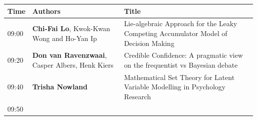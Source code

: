 \documentclass[]{article}
\begin{document}
\begin{longtable}[]{@{}lll@{}}
\toprule
\begin{minipage}[b]{0.03\columnwidth}\raggedright\strut
Time\strut
\end{minipage} & \begin{minipage}[b]{0.35\columnwidth}\raggedright\strut
Authors\strut
\end{minipage} & \begin{minipage}[b]{0.53\columnwidth}\raggedright\strut
Title\strut
\end{minipage}\tabularnewline
\midrule
\endhead
\begin{minipage}[t]{0.03\columnwidth}\raggedright\strut
09:00\strut
\end{minipage} & \begin{minipage}[t]{0.35\columnwidth}\raggedright\strut
\textbf{Chi-Fai Lo}, Kwok-Kwan Wong and Ho-Yan Ip\strut
\end{minipage} & \begin{minipage}[t]{0.53\columnwidth}\raggedright\strut
Lie-algebraic Approach for the Leaky Competing Accumulator Model of
Decision Making\strut
\end{minipage}\tabularnewline
\begin{minipage}[t]{0.03\columnwidth}\raggedright\strut
09:20\strut
\end{minipage} & \begin{minipage}[t]{0.35\columnwidth}\raggedright\strut
\textbf{Don van Ravenzwaai}, Casper Albers, Henk Kiers\strut
\end{minipage} & \begin{minipage}[t]{0.53\columnwidth}\raggedright\strut
Credible Confidence: A pragmatic view on the frequentist vs Bayesian
debate\strut
\end{minipage}\tabularnewline
\begin{minipage}[t]{0.03\columnwidth}\raggedright\strut
09:40\strut
\end{minipage} & \begin{minipage}[t]{0.35\columnwidth}\raggedright\strut
\textbf{Trisha Nowland}\strut
\end{minipage} & \begin{minipage}[t]{0.53\columnwidth}\raggedright\strut
Mathematical Set Theory for Latent Variable Modelling in Psychology
Research\strut
\end{minipage}\tabularnewline
\begin{minipage}[t]{0.03\columnwidth}\raggedright\strut
09:50\strut
\end{minipage} & \begin{minipage}[t]{0.35\columnwidth}\raggedright\strut

\end{minipage}
\end{longtable}
\end{document}

